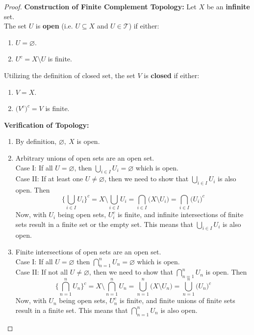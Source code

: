 \begin{proof}
    \textbf{Construction of Finite Complement Topology:} Let $X$ be an \textbf{infinite} set.\\
    The set $U$ is \textbf{open} (i.e. $U\subseteq X$ and $U\in\mathcal{T}$) if either:
    \begin{enumerate}
        \item $U=\varnothing$.
        \item $U^c=X\setminus U$ is finite.
    \end{enumerate}
    Utilizing the definition of closed set, the set $V$ is \textbf{closed} if either:
    \begin{enumerate}
        \item $V=X$.
        \item $\big(V^c\big)^c=V$ is finite.
    \end{enumerate}
    \textbf{Verification of Topology:}
    \begin{enumerate}
        \item By definition, $\varnothing,\ X$ is open.
        \item Arbitrary unions of open sets are an open set.\\
        Case I: If all $U=\varnothing$, then $\bigcup_{i\in I}U_i=\varnothing$ which is open.\\
        Case II: If at least one $U\neq\varnothing$, then we need to show that $\bigcup_{i\in I}U_i$ is also open. Then $$\big\{\bigcup_{i\in I}U_i\big\}^c=X\setminus \bigcup_{i\in I}U_i=\bigcap_{i\in I}\big(X\setminus U_i\big)=\bigcap_{i\in I}\big(U_i\big)^c$$
        Now, with $U_i$ being open sets, $U_i^c$ is finite, and infinite intersections of finite sets result in a finite set or the empty set. This means that $\bigcup_{i\in I}U_i$ is also open.
        \item Finite intersections of open sets are an open set.\\
        Case I: If all $U=\varnothing$ then $\bigcap_{n=1}^n U_n=\varnothing$ which is open.\\
        Case II: If not all $U\neq \varnothing$, then we need to show that $\bigcap_{n=1}^n U_n$ is open. Then $$\big\{\bigcap_{n=1}^n U_n\big\}^c=X\setminus\bigcap_{n=1}^n U_n=\bigcup_{n=1}^n\big(X\setminus U_n\big)=\bigcup_{n=1}^n \big(U_n\big)^c$$
        Now, with $U_n$ being open sets, $U_n^c$ is finite, and finite unions of finite sets result in a finite set. This means that $\bigcap_{n=1}^n U_n$ is also open.
    \end{enumerate}

\end{proof}
